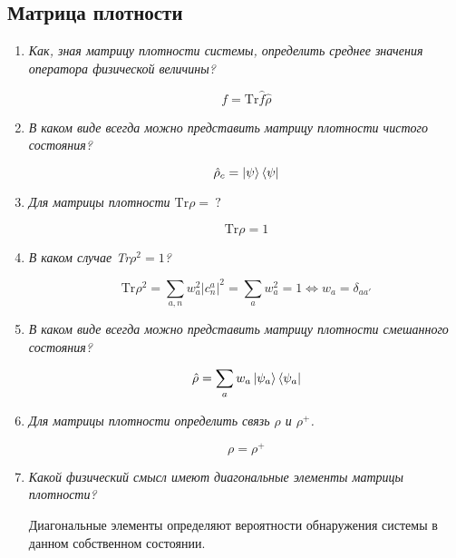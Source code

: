 \documentclass{article}
\begin{document}
\subsection*{Матрица плотности}
\begin{enumerate}
	\item \textit{Как, зная матрицу плотности системы, определить среднее значения оператора физической величины?}

	\begin{equation}
		f = \text{Tr} \hat{f}\hat{\rho}
	\end{equation}
	
	\item \textit{В каком виде всегда можно представить матрицу плотности чистого состояния?}

	\begin{equation}
		\hat{\rho}_c = \ket{\psi}\bra{\psi}
	\end{equation}
	
	\item \textit{Для матрицы плотности $\text{Tr} \rho = \ ?$}
	
	\begin{equation}
		\text{Tr}\rho = 1
	\end{equation}
	
	\item \textit{В каком случае Tr$\rho^2 = 1$?}
	
	\begin{equation}
		\text{Tr} \rho^2 = \sum\limits_{a,n}w^2_a |c_n^a|^2 = \sum\limits_{a} w^2_a = 1 \iff w_a = \delta_{aa'}
	\end{equation}
	
	\item \textit{В каком виде всегда можно представить матрицу плотности смешанного состояния?}
	
	\begin{equation}
		\hat{\rho} = \sum\limits_{a} w_a \ket{\psi_a}\bra{\psi_a}
	\end{equation}
	
	\item \textit{Для матрицы плотности определить связь $\rho$ и $\rho^+$.}
	
	\begin{equation}
		\rho = \rho^+
	\end{equation}
	
	\item \textit{Какой физический смысл имеют диагональные элементы матрицы плотности?}
	
	Диагональные элементы определяют вероятности обнаружения системы в данном собственном состоянии.
	

\end{enumerate}
\end{document}
